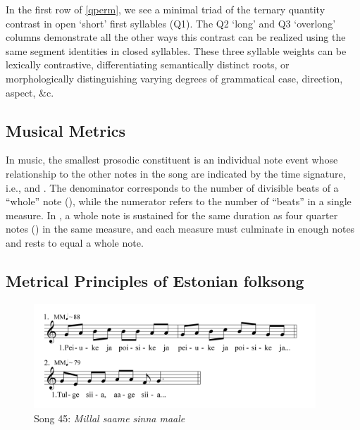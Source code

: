 In the first row of \ref{qperm}, we see a minimal triad of the ternary quantity contrast in open `short' first syllables (Q1). The Q2 `long' and Q3 `overlong' columns demonstrate all the other ways this contrast can be realized using the same segment identities in closed syllables. These three syllable weights can be lexically contrastive, differentiating semantically distinct roots, or morphologically distinguishing varying degrees of grammatical case, direction, aspect, \&c. 



 \subsection{Musical Metrics} 
In music, the smallest prosodic constituent is an individual note event whose relationship to the other notes in the song are indicated by the time signature, i.e.,  and . The denominator corresponds to the number of divisible beats of a ``whole'' note (\semibreve), while the numerator refers to the number of ``beats'' in a single measure. In  , a whole note is sustained for the same duration as  four quarter notes (\crotchet) in the same measure, and each measure must culminate in enough notes and rests to equal a whole note. 





\subsection{Metrical Principles of Estonian folksong}

\begin{figure}[ht]
\begin{center}
\includegraphics[width=300pt]{figures/045.png}
\caption{Song 45: {\it Millal saame sinna maale}}
\label{045}
\end{center}
\end{figure}

